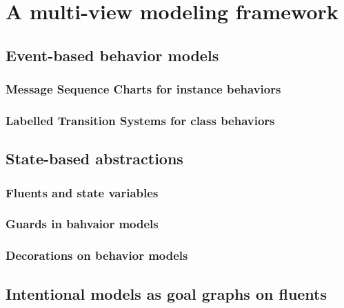 \chapter{A multi-view modeling framework}
\label{chap:framework}

\section{Event-based behavior models}
\subsection{Message Sequence Charts for instance behaviors}
\subsection{Labelled Transition Systems for class behaviors}

\section{State-based abstractions}
\subsection{Fluents and state variables}
\subsection{Guards in bahvaior models}
\subsection{Decorations on behavior models}

\section{Intentional models as goal graphs on fluents}

